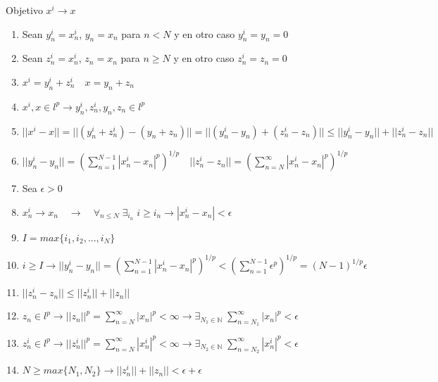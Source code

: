 Objetivo $x^i \to x$

\begin{enumerate}
  \item Sean $y_n^i = x_n^i$, $y_n = x_n$ para $n < N$ y en otro caso $y_n^i = y_n = 0$
  \item Sean $z_n^i = x_n^i$, $z_n = x_n$ para $n \geq N$ y en otro caso $z_n^i = z_n = 0$
  \item $x^i = y_n^i + z_n^i \quad x = y_n + z_n$
  \item $x^i, x \in l^p \to y_n^i, z_n^i, y_n, z_n\in l^p$
  \item $||x^i - x|| = ||(y_n^i + z_n^i) - (y_n + z_n)|| = ||(y_n^i - y_n) + (z_n^i - z_n)|| \leq ||y_n^i - y_n|| + ||z_n^i - z_n||$
  \item $||y_n^i - y_n|| = \left(\sum_{n=1}^{N-1} |x_n^i - x_n|^p \right)^{1/p} \quad ||z_n^i - z_n|| = \left(\sum_{n=N}^\infty |x_n^i - x_n|^p \right)^{1/p}$
  \item Sea $\epsilon > 0$
  \item $x_n^i \to x_n \quad \to \quad \forall_{n \leq N} \; \exists_{i_n} \; i \geq i_n \to |x_n^i - x_n| < \epsilon$
  \item $I = max\{i_1, i_2, ..., i_N\}$
  \item $i \geq I \to ||y_n^i - y_n|| = \left(\sum_{n=1}^{N-1} |x_n^i - x_n|^p \right)^{1/p} < \left(\sum_{n=1}^{N-1} \epsilon^p \right)^{1/p} = (N-1)^{1/p} \epsilon$
  \item $||z_n^i - z_n|| \leq ||z_n^i|| + ||z_n||$
  \item $z_n \in l^p \to ||z_n||^p = \sum_{n=N}^\infty |x_n|^p < \infty \to \exists_{N_1 \in \mathbb{N}} \; \sum_{n=N_1}^\infty |x_n|^p < \epsilon$
  \item $z_n^i \in l^p \to ||z_n^i||^p = \sum_{n=N}^\infty |x_n^i|^p < \infty \to \exists_{N_2 \in \mathbb{N}} \; \sum_{n=N_2}^\infty |x_n^i|^p < \epsilon$
  \item $N \geq max\{N_1, N_2\} \to ||z_n^i|| + ||z_n|| < \epsilon + \epsilon$

\end{enumerate}
